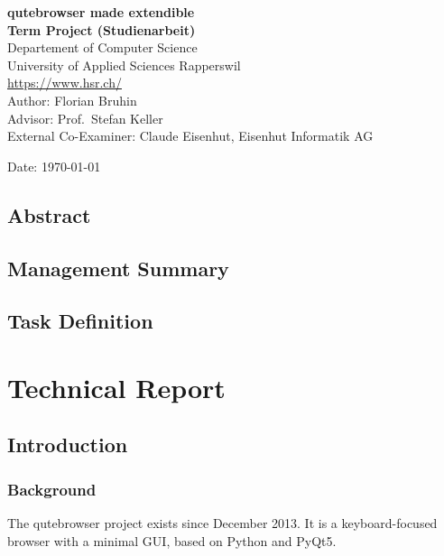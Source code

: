 \documentclass[a4paper,parskip=full]{scrreprt}
\begin{document}
\begin{titlepage}
\begin{flushleft}
{\huge \bfseries qutebrowser made extendible}\\[0.5cm]
{\large \bfseries Term Project (Studienarbeit)}\\[2cm]

Departement of Computer Science\\
University of Applied Sciences Rapperswil\\
\url{https://www.hsr.ch/}\\[1cm]

Author: Florian Bruhin\\[0.3cm]
Advisor: Prof.~Stefan Keller\\[0.3cm]
External Co-Examiner: Claude Eisenhut, Eisenhut Informatik AG

\vfill
Date: {\today}

\end{flushleft}

\end{titlepage}



\chapter*{Abstract}

\chapter*{Management Summary}


\tableofcontents
\listoffigures
\listoftables


\chapter*{Task Definition}  

\part{Technical Report}

\chapter{Introduction}

\section{Background}
The qutebrowser project exists since December 2013. It is a keyboard-focused
browser with a minimal GUI, based on Python and PyQt5.
\end{document}
